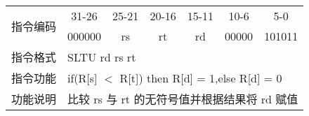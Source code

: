 	\begin{table}[!hbp]
		\centering
		\begin{tabular}{|c|c|c|c|c|c|c|}
		\hline
		\multirow{2}{*}{指令编码} & 31-26&25-21 & 20-16&15-11 &10-6 &5-0\\
		\cline{2-7} & 000000 & rs & rt & rd & 00000 & 101011 \\
		\hline
		指令格式&\multicolumn{6}{|l|}{SLTU rd rs rt}\\
		\hline		
		指令功能&\multicolumn{6}{|l|}{if(R[s] $<$ R[t]) then R[d] = 1,else R[d] = 0}\\
		\hline		
		功能说明&\multicolumn{6}{|l|}{比较 rs 与 rt 的无符号值并根据结果将 rd 赋值}\\
		\hline
		\end{tabular}
	\end{table}
\newpage

